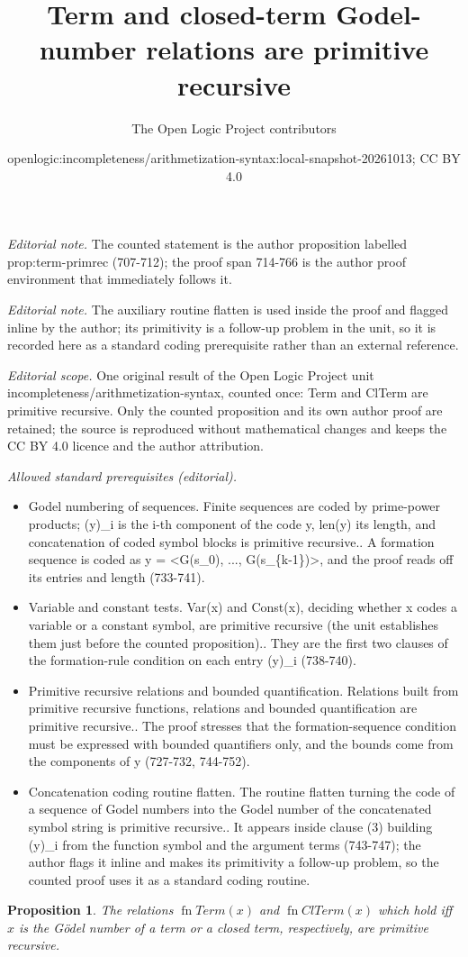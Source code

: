 \documentclass[10pt,a4paper]{article}
\title{Term and closed-term Godel-number relations are primitive recursive}
\author{The Open Logic Project contributors}
\date{openlogic:incompleteness/arithmetization-syntax:local-snapshot-20261013; CC BY 4.0}
\theoremstyle{plain}
\newtheorem{prop}[thm]{Proposition}
\theoremstyle{definition}
\theoremstyle{remark}
\newcommand*{\ollabel}[1]{\label{#1}}
\providecommand{\fn}{\operatorname{fn}}
\providecommand{\fn}{\operatorname{fn}}
\begin{document}
\maketitle
\noindent\textit{Editorial note.} The counted statement is the author proposition labelled prop:term-primrec (707-712); the proof span 714-766 is the author proof environment that immediately follows it.\par\medskip
\noindent\textit{Editorial note.} The auxiliary routine flatten is used inside the proof and flagged inline by the author; its primitivity is a follow-up problem in the unit, so it is recorded here as a standard coding prerequisite rather than an external reference.\par\medskip
\noindent\textit{Editorial scope.} One original result of the Open Logic Project unit incompleteness/arithmetization-syntax, counted once: Term and ClTerm are primitive recursive. Only the counted proposition and its own author proof are retained; the source is reproduced without mathematical changes and keeps the CC BY 4.0 licence and the author attribution.\par\medskip
\noindent\textit{Allowed standard prerequisites (editorial).}\begin{itemize}
\item Godel numbering of sequences. Finite sequences are coded by prime-power products; (y)\_i is the i-th component of the code y, len(y) its length, and concatenation of coded symbol blocks is primitive recursive.. A formation sequence is coded as y = <G(s\_0), ..., G(s\_\{k-1\})>, and the proof reads off its entries and length (733-741).
\item Variable and constant tests. Var(x) and Const(x), deciding whether x codes a variable or a constant symbol, are primitive recursive (the unit establishes them just before the counted proposition).. They are the first two clauses of the formation-rule condition on each entry (y)\_i (738-740).
\item Primitive recursive relations and bounded quantification. Relations built from primitive recursive functions, relations and bounded quantification are primitive recursive.. The proof stresses that the formation-sequence condition must be expressed with bounded quantifiers only, and the bounds come from the components of y (727-732, 744-752).
\item Concatenation coding routine flatten. The routine flatten turning the code of a sequence of Godel numbers into the Godel number of the concatenated symbol string is primitive recursive.. It appears inside clause (3) building (y)\_i from the function symbol and the argument terms (743-747); the author flags it inline and makes its primitivity a follow-up problem, so the counted proof uses it as a standard coding routine.
\end{itemize}\medskip
\begin{prop}
\ollabel{prop:term-primrec}
The relations $\fn{Term}(x)$ and $\fn{ClTerm}(x)$ which hold iff $x$
is the G\"odel number of a term or a closed term, respectively, are
primitive recursive.
\end{prop}
\end{document}
